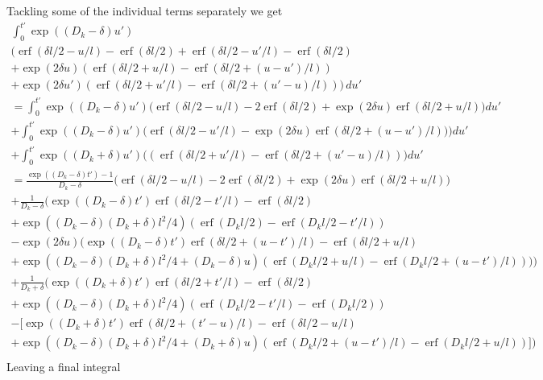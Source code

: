 \documentclass[a4paper]{article}
\newcommand{\erf}{\operatorname{erf}}
\begin{document}
Tackling some of the individual terms separately we get
\begin{multline}
  \int_0^{t'} \exp((D_k - \delta) u') \\
  \bigg(
  \erf(\delta l/2 - u/l) - \erf(\delta l/2)
  + \erf(\delta l/2 - u'/l) - \erf(\delta l/2) \\
  + \exp(2 \delta u) (\erf(\delta l/2 + u/l) - \erf(\delta l/2 +
  (u-u')/l)) \\
  + \exp(2 \delta u') (\erf(\delta l/2 + u'/l) - \erf(\delta l/2
  + (u'-u)/l))
  \bigg)
  \, du' \\
  = \int_0^{t'} \exp((D_k - \delta) u')
  \bigg(
  \erf(\delta l/2 - u/l) - 2\erf(\delta l/2)
  + \exp(2 \delta u) \erf(\delta l/2 + u/l)
  \bigg) du' \\
  +
  \int_0^{t'} \exp((D_k - \delta) u')
  \bigg(
  \erf(\delta l/2 - u'/l)
  - \exp(2 \delta u) \erf(\delta l/2 + (u-u')/l))
  \bigg) du' \\
  + \int_0^{t'} \exp((D_k + \delta) u')
  \bigg(
  (\erf(\delta l/2 + u'/l) - \erf(\delta l/2 + (u'-u)/l))
  \bigg) du' \\
  = 
  \frac{\exp((D_k-\delta) t') - 1}{D_k-\delta}
  \bigg(
  \erf(\delta l/2 - u/l) - 2\erf(\delta l/2)
  + \exp(2 \delta u) \erf(\delta l/2 + u/l)
  \bigg) \\
  + \frac{1}{D_k-\delta}
  \bigg(
  \exp((D_k-\delta)t') \erf(\delta l/2 - t'/l) - \erf(\delta l/2) \\
  + \exp((D_k-\delta)(D_k+\delta)l^2/4)
  (\erf(D_k l/2) - \erf(D_k l/2  - t'/l) ) \\
  - \exp(2 \delta u)
  (\exp((D_k-\delta)t') \erf(\delta l/2 + (u - t')/l) - \erf(\delta l/2
  + u / l) \\
  + \exp((D_k-\delta)(D_k+\delta)l^2/4 + (D_k - \delta)u)
  (\erf(D_k l/2 + u/l) - \erf(D_k l/2  + (u - t')/l) ))
  \bigg) \\
  + \frac{1}{D_k+\delta}
  \bigg(
  \exp((D_k+\delta)t') \erf(\delta l/2 + t'/l) - \erf(\delta l/2) \\
  + \exp((D_k-\delta)(D_k+\delta)l^2/4)
  (\erf(D_k l/2  - t'/l) - \erf(D_k l/2)) \\
  -
  [\exp((D_k+\delta)t') \erf(\delta l/2 + (t' - u)/l) - \erf(\delta l/2
  - u / l) \\
  + \exp((D_k-\delta)(D_k+\delta)l^2/4 + (D_k + \delta)u)
  (\erf(D_k l/2  + (u - t')/l) - \erf(D_k l/2 + u/l))]
  \bigg) \\
\end{multline}
Leaving a final integral
\end{document}
